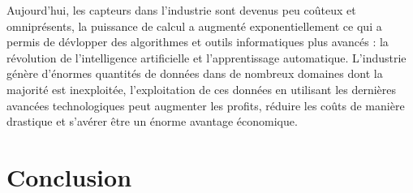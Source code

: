 Aujourd'hui, les capteurs dans l'industrie sont devenus peu coûteux et omniprésents, la puissance de calcul a augmenté exponentiellement ce qui a permis de dévlopper des algorithmes et outils informatiques plus avancés : la révolution de l'intelligence artificielle et l'apprentissage automatique. L’industrie génère d’énormes quantités de données dans de nombreux domaines dont la majorité est inexploitée, l’exploitation de ces données en utilisant les dernières avancées technologiques peut augmenter les profits, réduire les coûts de manière drastique et s’avérer être un énorme avantage économique.

\section{Conclusion}
